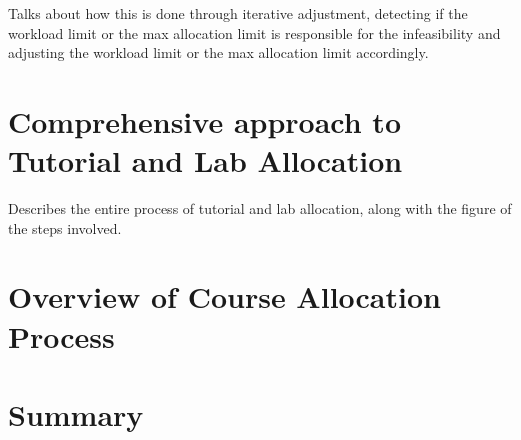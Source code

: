 Talks about how this is done through iterative adjustment, detecting if the workload limit or the max allocation limit is responsible for the infeasibility and adjusting the workload limit or the max allocation limit accordingly.

\section{Comprehensive approach to Tutorial and Lab Allocation}

Describes the entire process of tutorial and lab allocation, along with the figure of the steps involved.

\section{Overview of Course Allocation Process}


\section{Summary}
